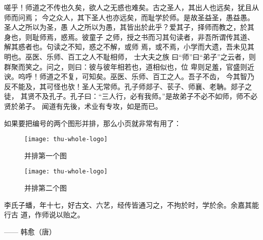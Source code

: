 嗟乎！师道之不传也久矣，欲人之无惑也难矣。古之圣人，其出人也远矣，犹且从师而问焉；
今之众人，其下圣人也亦远矣，而耻学於师。是故圣益圣，愚益愚。圣人之所以为圣，愚
人之所以为愚，其皆出於此乎？爱其子，择师而教之，於其身也，则耻师焉，惑焉。彼童子
之师，授之书而习其句读者，非吾所谓传其道、解其惑者也。句读之不知，惑之不解，或师
焉，或不焉，小学而大遗，吾未见其明也。巫医、乐师、百工之人不耻相师，  士大夫之族
曰“师”曰“弟子”之云者，则群聚而笑之。问之，则曰：彼与彼年相若也，道相似也，位
卑则足羞，官盛则近谀。呜呼！师道之不复，可知矣。巫医、乐师、百工之人。吾子不齿，
今其智乃反不能及，其可怪也欤！圣人无常师。孔子师郯子、苌子、师襄、老聃。郯子之徒，
其贤不及孔子。孔子曰：“三人行，必有我师。”是故弟子不必不如师，师不必贤於弟子。
闻道有先後，术业有专攻，如是而已。

如果要把编号的两个图形并排，那么小页就非常有用了：
\begin{figure}
\begin{minipage}{0.48\textwidth}
  \centering
  \texttt{[image: thu-whole-logo]}
  \caption{并排第一个图}
  \label{fig:parallel1}
\end{minipage}\hfill
\begin{minipage}{0.48\textwidth}
  \centering
  \texttt{[image: thu-whole-logo]}
  \caption{并排第二个图}
  \label{fig:parallel2}
\end{minipage}
\end{figure}

李氏子蟠，年十七，好古文、六艺，经传皆通习之，不拘於时，学於余。余嘉其能行古
道，作师说以贻之。

\hfill —— 韩愈（唐）

